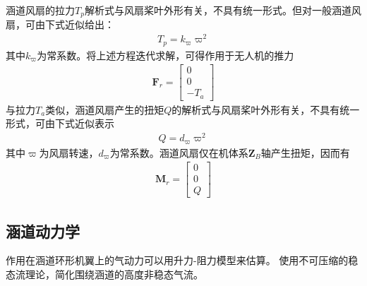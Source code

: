 涵道风扇的拉力$ T_p $解析式与风扇桨叶外形有关，不具有统一形式。但对一般涵道风扇，可由下式近似给出：
\begin{align}T_p = k_{\varpi} \varpi^{2}\end{align}
其中$ k_{\varpi} $为常系数。将上述方程迭代求解，可得作用于无人机的推力
\begin{align}
\bm{F}_{r}=\begin{bmatrix}
0\\0\\
-T_a
\end{bmatrix}
\end{align}
与拉力$ T_a $类似，涵道风扇产生的扭矩$ Q $的解析式与风扇桨叶外形有关，不具有统一形式，可由下式近似表示\cite{Stiltner_2012,Graf_2008}
\begin{align}
Q=d_{\varpi} { \varpi }^{2} 	\label{eq_Q}
\end{align}
其中$ \varpi $为风扇转速，$ d_{\varpi}  $为常系数。涵道风扇仅在机体系$ \bm{Z}_B $轴产生扭矩，因而有
\begin{align}
\bm{M}_{r}=\begin{bmatrix}
0\\0\\
Q
\end{bmatrix}
\end{align}
\subsection{涵道动力学}
作用在涵道环形机翼上的气动力可以用升力-阻力模型来估算。 使用不可压缩的稳态流理论，简化围绕涵道的高度非稳态气流。 

